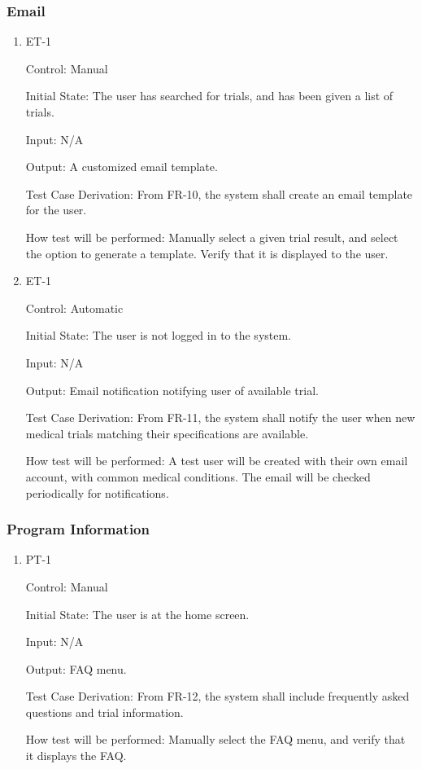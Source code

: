 \documentclass[12pt, titlepage]{article}
\begin{document}
\subsubsection{Email}

\begin{enumerate}


\item{ET-1\\}

Control: Manual
					
Initial State: The user has searched for trials, and has been given a list of trials.
					
Input: N/A
					
Output: A customized email template.

Test Case Derivation: From FR-10, the system shall create an email template for the user.

How test will be performed: Manually select a given trial result, and select the option to generate a template. Verify that it is displayed to the user.


\item{ET-1\\}

Control: Automatic
					
Initial State: The user is not logged in to the system.
					
Input: N/A
					
Output: Email notification notifying user of available trial.

Test Case Derivation: From FR-11, the system shall notify the user when new medical trials matching their specifications are available.

How test will be performed: A test user will be created with their own email account, with common medical conditions. The email will be checked periodically for notifications.


\end{enumerate}

\subsubsection{Program Information}

\begin{enumerate}

\item{PT-1\\}

Control: Manual
					
Initial State: The user is at the home screen.
					
Input: N/A
					
Output: FAQ menu.

Test Case Derivation: From FR-12, the system shall include frequently asked questions and trial information.

How test will be performed: Manually select the FAQ menu, and verify that it displays the FAQ.


\end{enumerate}
\end{document}

